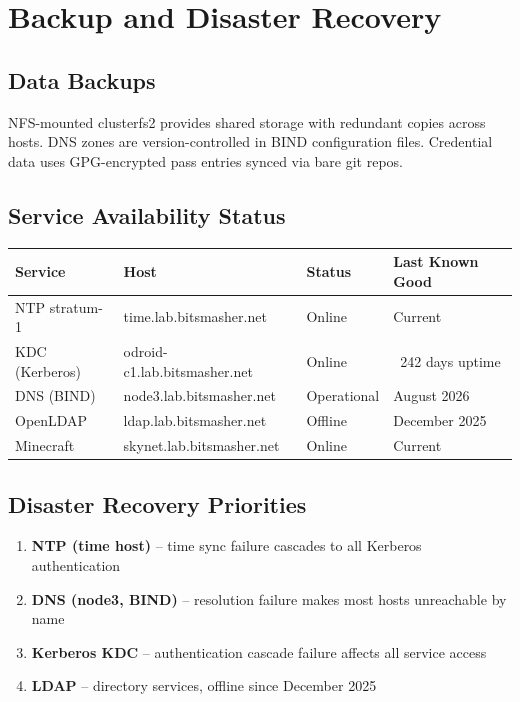 \section{Backup and Disaster Recovery}

\subsection{Data Backups}
NFS-mounted clusterfs2 provides shared storage with redundant copies across hosts. DNS zones are version-controlled in BIND configuration files. Credential data uses GPG-encrypted pass entries synced via bare git repos.

\subsection{Service Availability Status}

\begin{center}
\begin{tabular}{llll}
  \hline
  \textbf{Service} & \textbf{Host} & \textbf{Status} & \textbf{Last Known Good} \\ \hline
  NTP stratum-1 & time.lab.bitsmasher.net & Online & Current \\
  KDC (Kerberos) & odroid-c1.lab.bitsmasher.net & Online & ~242 days uptime \\
  DNS (BIND) & node3.lab.bitsmasher.net & Operational & August 2026 \\
  OpenLDAP & ldap.lab.bitsmasher.net & Offline & December 2025 \\
  Minecraft & skynet.lab.bitsmasher.net & Online & Current \\ \hline
\end{tabular}
\end{center}

\subsection{Disaster Recovery Priorities}
\begin{enumerate}
  \item \textbf{NTP (time host)} -- time sync failure cascades to all Kerberos authentication
  \item \textbf{DNS (node3, BIND)} -- resolution failure makes most hosts unreachable by name
  \item \textbf{Kerberos KDC} -- authentication cascade failure affects all service access
  \item \textbf{LDAP} -- directory services, offline since December 2025
\end{enumerate}

